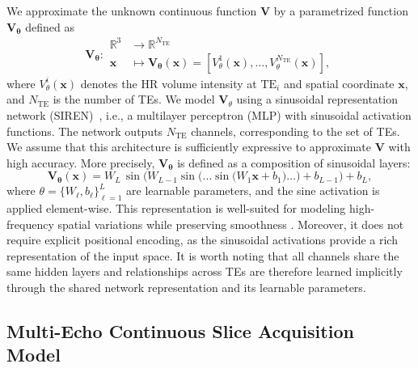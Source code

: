 \documentclass[preprint,authoryear,12pt]{elsarticle}
\begin{document}
We approximate the unknown continuous function $\mathbf{V}$ by a parametrized function $\mathbf{V_\theta}$ defined as
\[
\mathbf{V_\theta} :
\begin{aligned}
\mathbb{R}^3 &\to \mathbb{R}^{N_{\mathrm{TE}}} \\
\mathbf{x} &\mapsto \mathbf{V_\theta(\mathbf{x})} =
\left[
V^1_\theta(\mathbf{x}),
\dots,
V^{N_{\mathrm{TE}}}_\theta(\mathbf{x})
\right],
\end{aligned}
\]
where \(V^i_\theta(\mathbf{x})\) denotes the HR volume intensity at $\mathrm{TE}_i$ and spatial coordinate \(\mathbf{x}\), and $N_{\mathrm{TE}}$ is the number of TEs. We model $\mathbf{V}_{\theta}$ using a sinusoidal representation network (SIREN)~\citep{sitzmann_implicit_2020}, i.e., a multilayer perceptron (MLP) with sinusoidal activation functions. The network outputs \(N_{\mathrm{TE}}\) channels, corresponding to the set of TEs. We assume that this architecture is sufficiently expressive to approximate $\mathbf{V}$ with high accuracy. More precisely, \(\mathbf{V_\theta}\) is defined as a composition of sinusoidal layers:
\[
\mathbf{V_\theta(\mathbf{x})} =
W_L \, \sin\!\Big(
W_{L-1}\sin\!\big(
\dots
\sin\!\big(
W_1\mathbf{x} + b_1
\big)
\dots
\big) + b_{L-1}
\Big) + b_L,
\]
where \(\theta = \{W_\ell, b_\ell\}_{\ell=1}^{L}\) are learnable parameters, and the sine activation is applied element-wise. This representation is well-suited for modeling high-frequency spatial variations while preserving smoothness \citep{essakine_where_2024}. Moreover, it does not require explicit positional encoding, as the sinusoidal activations provide a rich representation of the input space. It is worth noting that all channels share the same hidden layers and relationships across TEs are therefore learned implicitly through the shared network representation and its learnable parameters.


\subsection{Multi-Echo Continuous Slice Acquisition Model}
\label{subsection:model}
\end{document}
